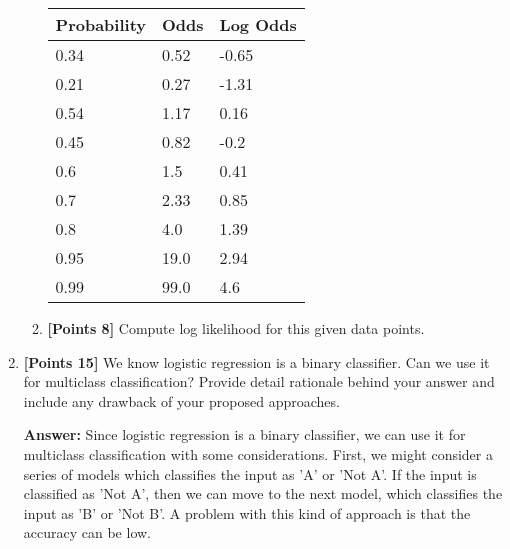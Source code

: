 \documentclass[12pt]{article}
\begin{document}
\begin{enumerate}
\begin{enumerate}
                    \begin{table}[h]
                        \centering
                        \begin{tabular}{l|l|l}
                            \textbf{Probability} & \textbf{Odds} & \textbf{Log Odds} \\
                            \hline
                            0.34                 & 0.52          & -0.65             \\
                            0.21                 & 0.27          & -1.31             \\
                            0.54                 & 1.17          & 0.16              \\
                            0.45                 & 0.82          & -0.2              \\
                            0.6                  & 1.5           & 0.41              \\
                            0.7                  & 2.33          & 0.85              \\
                            0.8                  & 4.0           & 1.39              \\
                            0.95                 & 19.0          & 2.94              \\
                            0.99                 & 99.0          & 4.6               \\
                        \end{tabular}
                    \end{table}
              \item \textbf{[Points 8]} Compute log likelihood for this given
                    data points.
          \end{enumerate}

    \item \textbf{[Points 15]} We know logistic regression is a binary
          classifier. Can we use it for multiclass classification? Provide
          detail rationale behind your answer and include any drawback of your
          proposed approaches.

          \textbf{Answer:}
          Since logistic regression is a binary classifier, we can use it for
          multiclass classification with some considerations. First, we might
          consider a series of models which classifies the input as 'A' or 'Not
          A'. If the input is classified as 'Not A', then we can move to the
          next model, which classifies the input as 'B' or 'Not B'. A problem
          with this kind of approach is that the accuracy can be low.


\end{enumerate}
\end{document}
